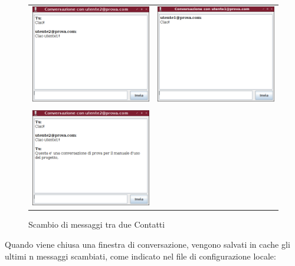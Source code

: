 \documentclass[a4paper, 11pt]{article} %
\begin{document}
\begin{figure}[H]
\hspace{-2.0cm}
\begin{tabular}{cc}
  \includegraphics[width=80mm]{images/client-6.png} & \includegraphics[width=80mm]{images/client-6-1.png} \\
  \\
  \includegraphics[width=80mm]{images/client-7.png}
\end{tabular}
\caption{Scambio di messaggi tra due Contatti}
\end{figure}
\clearpage
Quando viene chiusa una finestra di conversazione, vengono salvati in cache gli ultimi n messaggi scambiati, come indicato nel file di configurazione locale:
\end{document}
